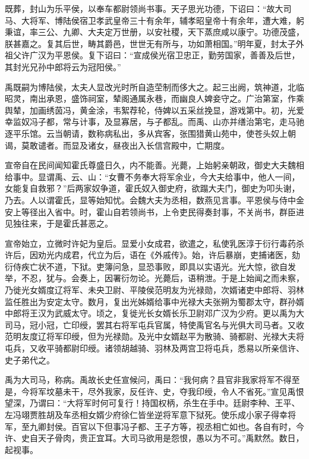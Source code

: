 \documentclass[12pt,UTF8]{ctexbook}
\begin{document}
既葬，封山为乐平侯，以奉车都尉领尚书事。天子思光功德，下诏曰：“故大司马、大将军、博陆侯宿卫孝武皇帝三十有余年，辅孝昭皇帝十有余年，遭大难，躬秉谊，率三公、九卿、大夫定万世册，以安社稷，天下蒸庶咸以康宁。功德茂盛，朕甚嘉之。复其后世，畴其爵邑，世世无有所与，功如萧相国。”明年夏，封太子外祖父许广汉为平恩侯。复下诏曰：“宣成侯光宿卫忠正，勤劳国家，善善及后世，其封光兄孙中郎将云为冠阳侯。”



禹既嗣为博陆侯，太夫人显改光时所自造茔制而侈大之。起三出阙，筑神道，北临昭灵，南出承恩，盛饰祠室，辇阁通属永巷，而幽良人婢妾守之。广治第室，作乘舆辇，加画绣茵冯，黄金涂，韦絮荐轮，侍婢以五采丝挽显，游戏第中。初，光爱幸监奴冯子都，常与计事，及显寡居，与子都乱。而禹、山亦并缮治第宅，走马驰逐平乐馆。云当朝请，数称病私出，多从宾客，张围猎黄山苑中，使苍头奴上朝谒，莫敢谴者。而显及诸女，昼夜出入长信宫殿中，亡期度。



宣帝自在民间闻知霍氏尊盛日久，内不能善。光薨，上始躬亲朝政，御史大夫魏相给事中。显谓禹、云、山：“女曹不务奉大将军余业，今大夫给事中，他人一间，女能复自救邪？”后两家奴争道，霍氏奴入御史府，欲蹋大夫门，御史为叩头谢，乃去。人以谓霍氏，显等始知忧。会魏大夫为丞相，数燕见言事。平恩侯与侍中金安上等径出入省中。时，霍山自若领尚书，上令吏民得奏封事，不关尚书，群臣进见独往来，于是霍氏甚恶之。



宣帝始立，立微时许妃为皇后。显爱小女成君，欲遣之，私使乳医淳于衍行毒药杀许后，因劝光内成君，代立为后，语在《外戚传》。始，许后暴崩，吏捕诸医，劾衍侍疾亡状不道，下狱。吏簿问急，显恐事败，即具以实语光。光大惊，欲自发举，不忍，犹与。会奏上，因署衍勿论。光薨后，语稍泄。于是上始闻之而未察，乃徙光女婿度辽将军、未央卫尉、平陵侯范明友为光禄勋，次婿诸吏中郎将、羽林监任胜出为安定太守。数月，复出光姊婿给事中光禄大夫张朔为蜀郡太守，群孙婿中郎将王汉为武威太守。顷之，复徙光长女婿长乐卫尉邓广汉为少府。更以禹为大司马，冠小冠，亡印绶，罢其右将军屯兵官属，特使禹官名与光俱大司马者。又收范明友度辽将军印绶，但为光禄勋。及光中女婿赵平为散骑、骑都尉、光禄大夫将屯兵，又收平骑都尉印绶。诸领胡越骑、羽林及两宫卫将屯兵，悉易以所亲信许、史子弟代之。



禹为大司马，称病。禹故长史任宣候问，禹曰：“我何病？县官非我家将军不得至是，今将军坟墓未干，尽外我家，反任许、史，夺我印绶，令人不省死。”宣见禹恨望深，乃谓曰：“大将军时何可复行！持国权柄，杀生在手中。廷尉李种、王平、左冯翊贾胜胡及车丞相女婿少府徐仁皆坐逆将军意下狱死。使乐成小家子得幸将军，至九卿封侯。百官以下但事冯子都、王子方等，视丞相亡如也。各自有时，今许、史自天子骨肉，贵正宜耳。大司马欲用是怨恨，愚以为不可。”禹默然。数日，起视事。
\end{document}
